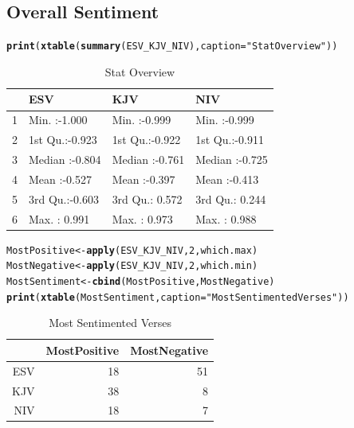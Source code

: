 \documentclass{article}\usepackage[]{graphicx}\usepackage[]{color}
\makeatletter
\newcommand{\hlnum}[1]{\textcolor[rgb]{0.686,0.059,0.569}{#1}}%
\newcommand{\hlstr}[1]{\textcolor[rgb]{0.192,0.494,0.8}{#1}}%
\newcommand{\hlstd}[1]{\textcolor[rgb]{0.345,0.345,0.345}{#1}}%
\newcommand{\hlkwb}[1]{\textcolor[rgb]{0.69,0.353,0.396}{#1}}%
\newcommand{\hlkwc}[1]{\textcolor[rgb]{0.333,0.667,0.333}{#1}}%
\newcommand{\hlkwd}[1]{\textcolor[rgb]{0.737,0.353,0.396}{\textbf{#1}}}%
\newenvironment{kframe}{%
 \def\at@end@of@kframe{}%
 \ifinner\ifhmode%
  \def\at@end@of@kframe{\end{minipage}}%
  \begin{minipage}{\columnwidth}%
 \fi\fi%
 \def\FrameCommand##1{\hskip\@totalleftmargin \hskip-\fboxsep
 \colorbox{shadecolor}{##1}\hskip-\fboxsep
     \hskip-\linewidth \hskip-\@totalleftmargin \hskip\columnwidth}%
 \MakeFramed {\advance\hsize-\width
   \@totalleftmargin\z@ \linewidth\hsize
   \@setminipage}}%
 {\par\unskip\endMakeFramed%
 \at@end@of@kframe}
\makeatother
\begin{document}
\subsection{Overall Sentiment}
\begin{kframe}
\begin{alltt}
\hlkwd{print}\hlstd{(}\hlkwd{xtable}\hlstd{(}\hlkwd{summary}\hlstd{(ESV_KJV_NIV),} \hlkwc{caption} \hlstd{=} \hlstr{"Stat Overview"}\hlstd{))}
\end{alltt}
\end{kframe}%
\begin{table}[ht]
\centering
\begin{tabular}{rlll}
  \hline
 &      ESV &      KJV &      NIV \\ 
  \hline
1 & Min.   :-1.000   & Min.   :-0.999   & Min.   :-0.999   \\ 
  2 & 1st Qu.:-0.923   & 1st Qu.:-0.922   & 1st Qu.:-0.911   \\ 
  3 & Median :-0.804   & Median :-0.761   & Median :-0.725   \\ 
  4 & Mean   :-0.527   & Mean   :-0.397   & Mean   :-0.413   \\ 
  5 & 3rd Qu.:-0.603   & 3rd Qu.: 0.572   & 3rd Qu.: 0.244   \\ 
  6 & Max.   : 0.991   & Max.   : 0.973   & Max.   : 0.988   \\ 
   \hline
\end{tabular}
\caption{Stat Overview} 
\end{table}
\begin{kframe}\begin{alltt}
\hlstd{MostPositive} \hlkwb{<-} \hlkwd{apply}\hlstd{(ESV_KJV_NIV,} \hlnum{2}\hlstd{, which.max)}
\hlstd{MostNegative} \hlkwb{<-} \hlkwd{apply}\hlstd{(ESV_KJV_NIV,} \hlnum{2}\hlstd{, which.min)}
\hlstd{MostSentiment} \hlkwb{<-} \hlkwd{cbind}\hlstd{(MostPositive, MostNegative)}
\hlkwd{print}\hlstd{(}\hlkwd{xtable}\hlstd{(MostSentiment,} \hlkwc{caption} \hlstd{=} \hlstr{"Most Sentimented Verses"}\hlstd{))}
\end{alltt}
\end{kframe}%
\begin{table}[ht]
\centering
\begin{tabular}{rrr}
  \hline
 & MostPositive & MostNegative \\ 
  \hline
ESV &  18 &  51 \\ 
  KJV &  38 &   8 \\ 
  NIV &  18 &   7 \\ 
   \hline
\end{tabular}
\caption{Most Sentimented Verses} 
\end{table}
\end{document}
